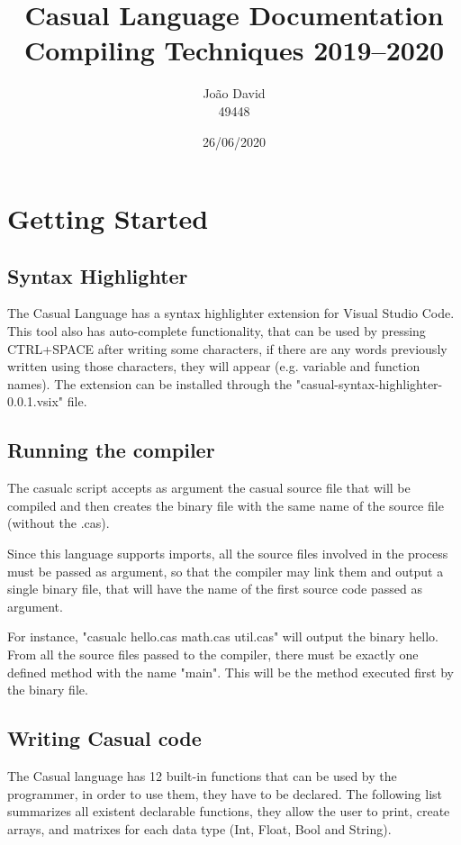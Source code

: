 \documentclass[12pt]{article}
\title{Casual Language Documentation \\
  \Large Compiling Techniques 2019--2020
}
\author{
  João David\\49448
}
\date{26/06/2020}
\begin{document}
\maketitle


\section{Getting Started}
\subsection{Syntax Highlighter}
The Casual Language has a syntax highlighter extension for Visual Studio Code. This tool also has auto-complete functionality, that can be used by pressing CTRL+SPACE after writing some characters, if there are any words previously written using those characters, they will appear (e.g. variable and function names).
The extension can be installed through the "casual-syntax-highlighter-0.0.1.vsix" file.

\subsection{Running the compiler}
The casualc script accepts as argument the casual source file that will be compiled and then creates the binary file with the same name of the source file (without the .cas). 

Since this language supports imports, all the source files involved in the process must be passed as argument, so that the compiler may link them and output a single binary file, that will have the name of the first source code passed as argument.

For instance, "casualc hello.cas math.cas util.cas" will output the binary hello.
From all the source files passed to the compiler, there must be exactly one defined method with the name "main". This will be the method executed first by the binary file.

\newpage

\subsection{Writing Casual code}
The Casual language has 12 built-in functions that can be used by the programmer, in order to use them, they have to be declared. The following list summarizes all existent declarable functions, they allow the user to print, create arrays, and matrixes for each data type (Int, Float, Bool and String). \\
\end{document}
